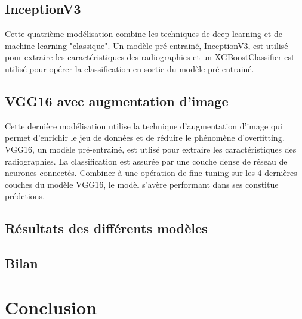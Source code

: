 \documentclass[11pt,twoside,openright]{article}
\begin{document}
\subsection{InceptionV3}

Cette quatrième modélisation combine les techniques de deep learning et de machine learning "classique". Un modèle pré-entrainé, InceptionV3, est utilisé pour extraire les caractéristiques des radiographies et un XGBoostClassifier est utilisé pour opérer la classification en sortie du modèle pré-entrainé.

\subsection{VGG16 avec augmentation d'image}

Cette dernière modélisation utilise la technique d'augmentation d'image qui permet d'enrichir le jeu de données et de réduire le phénomène d'overfitting. VGG16, un modèle pré-entrainé, est utlisé pour extraire les caractéristiques des radiographies. La classification est assurée par une couche dense de réseau de neurones connectés.
Combiner à une opération de fine tuning sur les 4 dernières couches du modèle VGG16, le modèl s'avère performant dans ses constitue prédctions.

\subsection{Résultats des différents modèles}

\subsection{Bilan}

\section{Conclusion}
\end{document}
